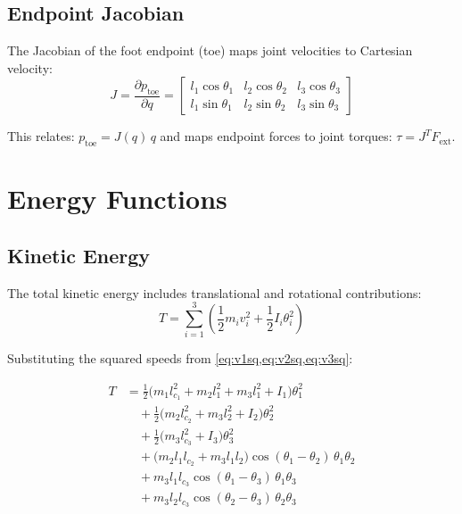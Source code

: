 \documentclass[11pt,a4paper]{article}
\newcommand{\vc}[1]{\bm{#1}}
\newcommand{\dt}[1]{\dot{#1}}
\newcommand{\pder}[2]{\frac{\partial #1}{\partial #2}}
\def\vc#1{#1}%
\def\dt#1{#1}%
\def\bm#1{#1}%
\begin{document}
\subsection{Endpoint Jacobian}

The Jacobian of the foot endpoint (toe) maps joint velocities to Cartesian velocity:
\begin{equation}
    \vc{J} = \pder{\vc{p}_{\text{toe}}}{\vc{q}} =
    \begin{bmatrix}
        l_1 \cos\theta_1 & l_2 \cos\theta_2 & l_3 \cos\theta_3 \\
        l_1 \sin\theta_1 & l_2 \sin\theta_2 & l_3 \sin\theta_3
    \end{bmatrix}
    \label{eq:jacobian}
\end{equation}

This relates: $\dt{\vc{p}}_{\text{toe}} = \vc{J}(\vc{q}) \, \dt{\vc{q}}$
and maps endpoint forces to joint torques: $\vc{\tau} = \vc{J}^T \vc{F}_{\text{ext}}$.

\section{Energy Functions}

\subsection{Kinetic Energy}

The total kinetic energy includes translational and rotational contributions:
\begin{equation}
    T = \sum_{i=1}^{3} \left( \frac{1}{2} m_i v_i^2 + \frac{1}{2} I_i \dt{\theta}_i^2 \right)
    \label{eq:kinetic_general}
\end{equation}

Substituting the squared speeds from \cref{eq:v1sq,eq:v2sq,eq:v3sq}:

\begin{resultbox}
\begin{align}
    T &= \frac{1}{2}\bigl(m_1 l_{c_1}^2 + m_2 l_1^2 + m_3 l_1^2 + I_1\bigr) \dt{\theta}_1^2 \nonumber \\
      &\quad + \frac{1}{2}\bigl(m_2 l_{c_2}^2 + m_3 l_2^2 + I_2\bigr) \dt{\theta}_2^2 \nonumber \\
      &\quad + \frac{1}{2}\bigl(m_3 l_{c_3}^2 + I_3\bigr) \dt{\theta}_3^2 \nonumber \\
      &\quad + \bigl(m_2 l_1 l_{c_2} + m_3 l_1 l_2\bigr) \cos(\theta_1 - \theta_2) \, \dt{\theta}_1 \dt{\theta}_2 \nonumber \\
      &\quad + m_3 l_1 l_{c_3} \cos(\theta_1 - \theta_3) \, \dt{\theta}_1 \dt{\theta}_3 \nonumber \\
      &\quad + m_3 l_2 l_{c_3} \cos(\theta_2 - \theta_3) \, \dt{\theta}_2 \dt{\theta}_3
    \label{eq:kinetic_expanded}
\end{align}
\end{resultbox}
\end{document}

